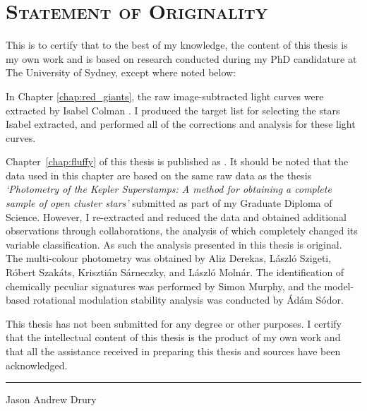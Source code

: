 \chapter*{\textsc{Statement of Originality}}
\vspace{-0.5cm}

This is to certify that to the best of my knowledge, the content of this thesis is my own work and is based on research conducted during my PhD candidature at The University of Sydney, except where noted below:

\vspace{0.5cm}

In Chapter \ref{chap:red_giants}, the raw image-subtracted light curves were extracted by Isabel Colman \citep{colman_pixels_2020}. I produced the target list for selecting the stars Isabel extracted, and performed all of the corrections and analysis for these light curves.

\vspace{0.5cm}

Chapter~\ref{chap:fluffy} of this thesis is published as \cite{drury_large_2017}. 
It should be noted that the data used in this chapter are based on the same raw data as the thesis {\it `Photometry of the Kepler Superstamps: A method for obtaining a complete sample of open cluster stars'} submitted as part of my Graduate Diploma of Science. However, I re-extracted and reduced the data and obtained additional observations through collaborations, the analysis of which completely changed its variable classification. As such the analysis presented in this thesis is original. The multi-colour photometry was obtained by Aliz Derekas, L\'aszl\'o Szigeti, R\'obert Szak\'ats, Kriszti\'an S\'arneczky, and L\'aszl\'o Moln\'ar. The identification of chemically peculiar signatures was performed by Simon Murphy, and the model-based rotational modulation stability analysis was conducted by \'Ad\'am S\'odor.

\vspace{0.5cm}

This thesis has not been submitted for any degree or other purposes. I certify that the intellectual content of this thesis is the product of my own work and that all the assistance received in preparing this thesis and sources have been acknowledged.

\vspace{1cm}

\begin{center}
\textcolor{white}{\rule{1cm}{2cm}}
Jason Andrew Drury
\end{center}

